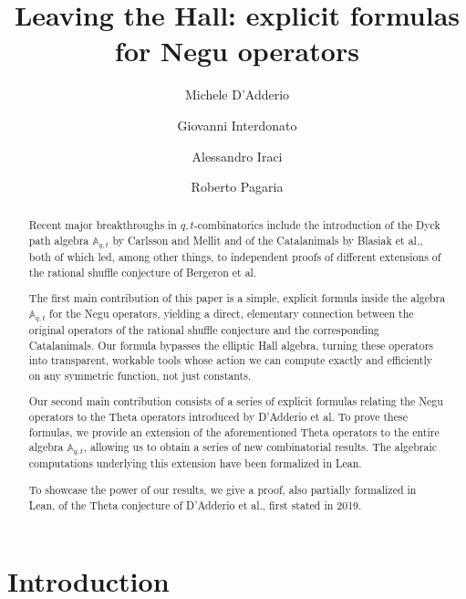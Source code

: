 \documentclass[reqno]{amsart}
\title{Leaving the Hall: explicit formulas for Negu\textcommabelow{t} operators}
\author{Michele D'Adderio}
\author{Giovanni Interdonato}
\author{Alessandro Iraci}
\author{Roberto Pagaria}
\theoremstyle{plain}
\theoremstyle{definition}
\theoremstyle{remark}
\newcommand{\A}{\mathbb{A}}%
\newcommand{\<}{\langle}
\renewcommand{\>}{\rangle}
\begin{document}
\begin{abstract}
    Recent major breakthroughs in $q,t$-combinatorics include the introduction of the Dyck path algebra $\A_{q,t}$ by Carlsson and Mellit and of the Catalanimals by Blasiak et al., both of which led, among other things, to independent proofs of different extensions of the rational shuffle conjecture of Bergeron et al.

    The first main contribution of this paper is a simple, explicit formula inside the algebra $\A_{q,t}$ for the Negu operators, yielding a direct, elementary connection between the original operators of the rational shuffle conjecture and the corresponding Catalanimals. Our formula bypasses the elliptic Hall algebra, turning these operators into transparent, workable tools whose action we can compute exactly and efficiently on any symmetric function, not just constants.

    Our second main contribution consists of a series of explicit formulas relating the Negu operators to the Theta operators introduced by D'Adderio et al. To prove these formulas, we provide an extension of the aforementioned Theta operators to the entire algebra $\A_{q,t}$, allowing us to obtain a series of new combinatorial results. The algebraic computations underlying this extension have been formalized in Lean.

    To showcase the power of our results, we give a proof, also partially formalized in Lean, of the Theta conjecture of D'Adderio et al., first stated in 2019.
\end{abstract}

\maketitle
\tableofcontents

\section{Introduction}
\end{document}
